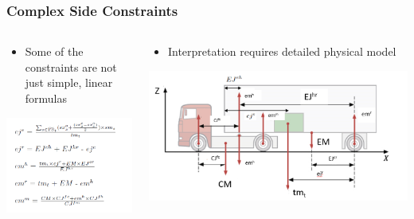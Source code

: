 \documentclass[dvipsnames,aspectratio=169]{beamer}
\begin{document}
\begin{frame}
\frametitle{Complex Side Constraints}
\begin{columns}
\begin{column}{0.5\textwidth}
\begin{itemize}
\item Some of the constraints are not just simple, linear formulas
\end{itemize}
\includegraphics[width=\textwidth]{images/roadefaxleweightconstraints}
\end{column}
\begin{column}{0.5\textwidth}
\begin{itemize}
\item Interpretation requires detailed physical model
\end{itemize}
\includegraphics[width=\textwidth]{images/roadeftrailerfields}
\end{column}
\end{columns}
\end{frame}
\end{document}
